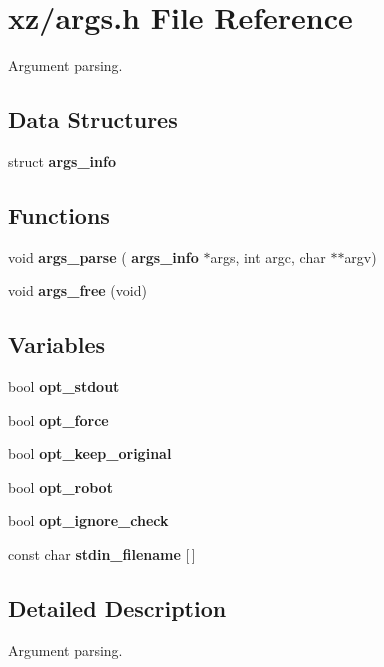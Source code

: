 \section{xz/args.h File Reference}
\label{args_8h}


Argument parsing.  


\subsection*{Data Structures}
\begin{DoxyCompactItemize}
\item 
struct \textbf{ args\+\_\+info}
\end{DoxyCompactItemize}
\subsection*{Functions}
\begin{DoxyCompactItemize}
\item 
\mbox{\label{args_8h_a05c34191dc1aba862787f62481139730}} 
void {\bfseries args\+\_\+parse} (\textbf{ args\+\_\+info} $\ast$args, int argc, char $\ast$$\ast$argv)
\item 
\mbox{\label{args_8h_a27ea51fc491cd85e4f9fc20f03bc273c}} 
void {\bfseries args\+\_\+free} (void)
\end{DoxyCompactItemize}
\subsection*{Variables}
\begin{DoxyCompactItemize}
\item 
\mbox{\label{args_8h_a9adffaea369e78666c7b50bfce10c764}} 
bool {\bfseries opt\+\_\+stdout}
\item 
\mbox{\label{args_8h_ae77f19014fc2e31a20d7e3e3a2224dc5}} 
bool {\bfseries opt\+\_\+force}
\item 
\mbox{\label{args_8h_a631cfa4029ae02603ce134e84262fa23}} 
bool {\bfseries opt\+\_\+keep\+\_\+original}
\item 
\mbox{\label{args_8h_a4048d9a6b2322c886d91932f63cb7c2b}} 
bool {\bfseries opt\+\_\+robot}
\item 
\mbox{\label{args_8h_ae9c03bd3fee505dab3cfc2090e3a2466}} 
bool {\bfseries opt\+\_\+ignore\+\_\+check}
\item 
\mbox{\label{args_8h_a634a0202402ef35c039505443288e738}} 
const char {\bfseries stdin\+\_\+filename} [$\,$]
\end{DoxyCompactItemize}


\subsection{Detailed Description}
Argument parsing. 

